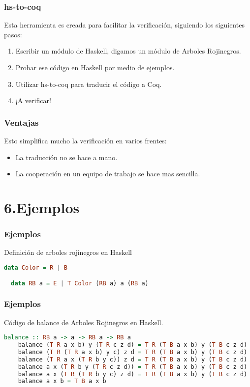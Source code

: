 \documentclass[xcolor=dvipsnames,table,handout]{beamer}
\begin{document}
\begin{frame}
  \frametitle{hs-to-coq}
        Esta herramienta es creada para facilitar la verificación, siguiendo los siguientes pasos:
        \begin{enumerate}
            \item Escribir un módulo de Haskell, digamos un módulo de Arboles Rojinegros.
            \item Probar ese código en Haskell por medio de ejemplos.
            \item Utilizar hs-to-coq para traducir el código a Coq.
            \item ¡A verificar!
        \end{enumerate}
\end{frame}


\begin{frame}[fragile]
  \frametitle{Ventajas}
        Esto simplifica mucho la verificación en varios frentes:
         \begin{itemize}
            \item La traducción no se hace a mano.
            \item La cooperación en un equipo de trabajo se hace mas sencilla.
        \end{itemize}
\end{frame}
\section{6.Ejemplos}

\begin{frame}[fragile]
  \frametitle{Ejemplos}

  Definición de arboles rojinegros en Haskell
  \begin{lstlisting}[language=haskell]
  data Color = R | B

  data RB a = E | T Color (RB a) a (RB a)
  \end{lstlisting}

\end{frame}

\begin{frame}[fragile]
  \frametitle{Ejemplos}
  Código de balance de Arboles Rojinegros en Haskell.
       \begin{lstlisting}[language=haskell]
    balance :: RB a -> a -> RB a -> RB a
    balance (T R a x b) y (T R c z d) = T R (T B a x b) y (T B c z d)
    balance (T R (T R a x b) y c) z d = T R (T B a x b) y (T B c z d)
    balance (T R a x (T R b y c)) z d = T R (T B a x b) y (T B c z d)
    balance a x (T R b y (T R c z d)) = T R (T B a x b) y (T B c z d)
    balance a x (T R (T R b y c) z d) = T R (T B a x b) y (T B c z d)
    balance a x b = T B a x b
       \end{lstlisting}
\end{frame}
\end{document}
